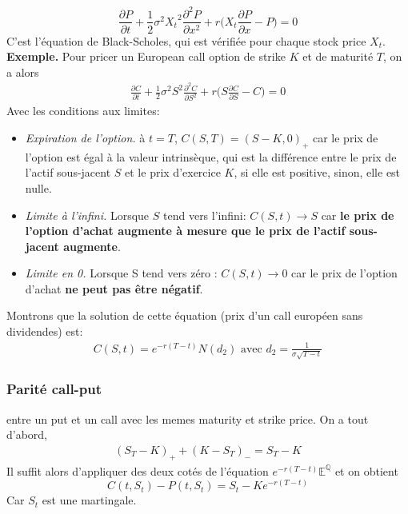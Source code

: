 \documentclass[a4paper]{article}
\begin{document}
\begin{equation}
    \boxed{\frac{\partial P}{\partial t} + \frac{1}{2} \sigma ^2 {X_t}^2 \frac{\partial ^2 P}{\partial x^2} + r\bigg( X_t \frac{\partial P}{\partial x} - P\bigg) =0}
\end{equation}
C'est l'équation de Black-Scholes, qui est vérifiée pour chaque stock price $X_t$.
\\
\textbf{Exemple.} Pour pricer un European call option de strike $K$ et de maturité $T$, on a alors 
\begin{align*}
    \frac{\partial C}{\partial t} + \frac{1}{2} \sigma ^2 {S}^2 \frac{\partial ^2 C}{\partial S^2} + r\bigg( S \frac{\partial C}{\partial S} - C\bigg) =0
\end{align*}
Avec les conditions aux limites:
\begin{itemize}
    \item \textit{Expiration de l'option.} à $t=T$, $C(S,T)=(S-K, 0)_{+}$ car le prix de l'option est égal à la valeur intrinsèque, qui est la différence entre le prix de l'actif sous-jacent $S$ et le prix d'exercice $K$, si elle est positive, sinon, elle est nulle.
    \item \textit{Limite à l'infini.} Lorsque $S$ tend vers l'infini: $C(S, t) \rightarrow S$ car \textbf{le prix de l'option d'achat augmente à mesure que le prix de l'actif sous-jacent augmente}.
    \item \textit{Limite en 0.} Lorsque S tend vers zéro : $C(S, t) \rightarrow 0$ car le prix de l'option d'achat \textbf{ne peut pas être négatif}. 
\end{itemize}
Montrons que la solution de cette équation (prix d'un call européen sans dividendes) est:
\begin{align}
    C(S,t)=e^{-r(T-t)} N(d_2) \text{   avec   } d_2 = \frac{1}{\sigma \sqrt{T-t}}
\end{align}


\subsubsection{Parité call-put} entre un put et un call avec les memes maturity et strike price. On a tout d'abord,
\begin{align*}
    (S_T-K)_+ + (K-S_T)_- = S_T - K
\end{align*}
Il suffit alors d'appliquer des deux cotés de l'équation $e^{-r(T-t)} \mathbb{E}^{\mathbb{Q}}$ et on obtient
\begin{equation}
    C(t, S_t) - P(t, S_t) = S_t - K e^{-r(T-t)}
\end{equation}
Car $S_t$ est une martingale. 
\end{document}
